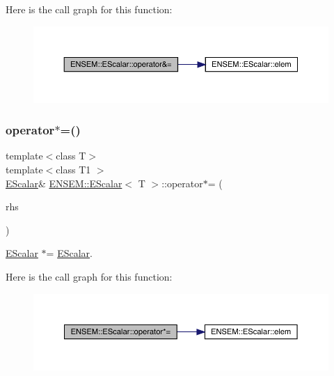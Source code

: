 Here is the call graph for this function\+:
\nopagebreak
\begin{figure}[H]
\begin{center}
\leavevmode
\includegraphics[width=350pt]{d0/d82/classENSEM_1_1EScalar_a4e16e2cecacdfefd6f01dcc360c6945b_cgraph}
\end{center}
\end{figure}
\mbox{\label{classENSEM_1_1EScalar_aa614bef8258a8ea3c2711c4d7d032c1a}} 
\subsubsection{\texorpdfstring{operator$\ast$=()}{operator*=()}\hspace{0.1cm}{\footnotesize\ttfamily [1/2]}}
{\footnotesize\ttfamily template$<$class T$>$ \\
template$<$class T1 $>$ \\
\mbox{\hyperlink{classENSEM_1_1EScalar}{E\+Scalar}}\& \mbox{\hyperlink{classENSEM_1_1EScalar}{E\+N\+S\+E\+M\+::\+E\+Scalar}}$<$ T $>$\+::operator$\ast$= (\begin{DoxyParamCaption}\item[{const \mbox{\hyperlink{classENSEM_1_1EScalar}{E\+Scalar}}$<$ T1 $>$ \&}]{rhs }\end{DoxyParamCaption})\hspace{0.3cm}{\ttfamily [inline]}}



\mbox{\hyperlink{classENSEM_1_1EScalar}{E\+Scalar}} $\ast$= \mbox{\hyperlink{classENSEM_1_1EScalar}{E\+Scalar}}. 

Here is the call graph for this function\+:
\nopagebreak
\begin{figure}[H]
\begin{center}
\leavevmode
\includegraphics[width=350pt]{d0/d82/classENSEM_1_1EScalar_aa614bef8258a8ea3c2711c4d7d032c1a_cgraph}
\end{center}
\end{figure}
\mbox{\label{classENSEM_1_1EScalar_aa614bef8258a8ea3c2711c4d7d032c1a}} 
